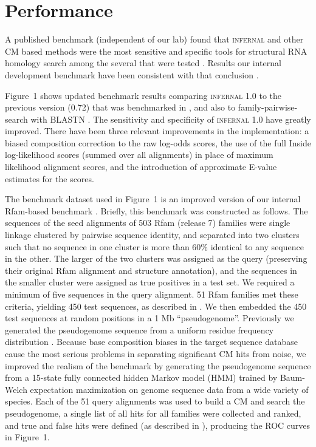 \documentclass[11pt]{article}
\begin{document}
\section{Performance}

A published benchmark (independent of our lab) found that
\textsc{infernal} and other CM based methods were the most sensitive
and specific tools for structural RNA homology search among the
several that were tested \citep{Freyhult07}.  Results our internal
development benchmark have been consistent with
that conclusion \citep{NawrockiEddy07}. 

Figure~1 shows updated benchmark results comparing \textsc{infernal}
1.0 to the previous version (0.72) that was benchmarked in
\citep{Freyhult07}, and also to family-pairwise-search with BLASTN
\citep{Altschul97,Grundy98b}.  The sensitivity and specificity of
\textsc{infernal} 1.0 have greatly improved. There have been three
relevant improvements in the implementation: a biased composition
correction to the raw log-odds scores, the use of the full Inside
log-likelihood scores (summed over all alignments) in place of maximum
likelihood alignment scores, and the introduction of approximate
E-value estimates for the scores.

The benchmark dataset used in Figure~1 is an improved version of our
internal Rfam-based benchmark \citep{NawrockiEddy07}. Briefly, this
benchmark was constructed as follows. The sequences of the seed
alignments of 503 Rfam (release 7) families were single linkage
clustered by pairwise sequence identity, and separated into two
clusters such that no sequence in one cluster is more than 60\%
identical to any sequence in the other. The larger of the two clusters
was assigned as the query (preserving their original Rfam alignment
and structure annotation), and the sequences in the smaller cluster
were assigned as true positives in a test set. We required a minimum
of five sequences in the query alignment. 51 Rfam families met these
criteria, yielding 450 test sequences, as described in
\citep{NawrockiEddy07}. We then embedded the 450 test sequences at random
positions in a 1 Mb ``pseudogenome''. Previously we generated the
pseudogenome sequence from a uniform residue frequency distribution
\citep{NawrockiEddy07}. Because base composition biases in the target
sequence database cause the most serious problems in separating
significant CM hits from noise, we improved the realism of the
benchmark by generating the pseudogenome sequence from a 15-state
fully connected hidden Markov model (HMM) trained by Baum-Welch
expectation maximization \citep{Durbin98} on genome sequence data from
a wide variety of species. Each of the 51 query alignments was used to
build a CM and search the pseudogenome, a single list of all hits for
all families were collected and ranked, and true and false hits were
defined (as described in \citep{NawrockiEddy07}), producing the
ROC curves in Figure~1.
\end{document}
